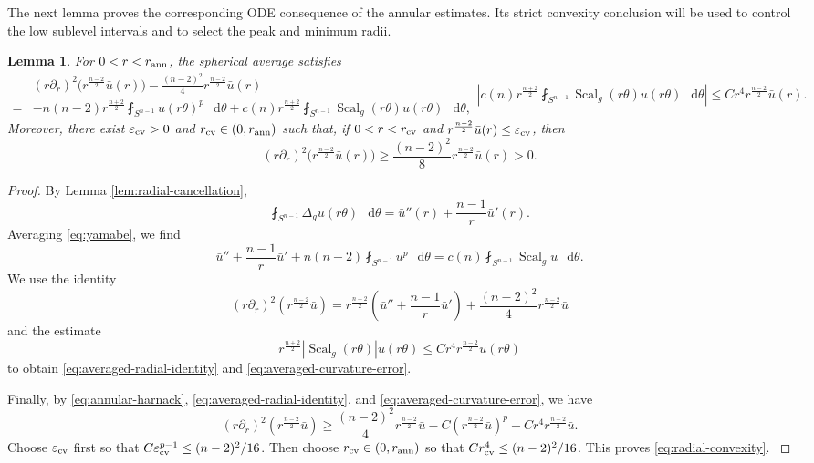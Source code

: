\documentclass[11pt]{article}
\numberwithin{equation}{section}
\newtheorem{lemma}[theorem]{Lemma}
\theoremstyle{remark}
\newcommand{\Sph}{S}
\newcommand{\pa}{\partial}
\newcommand{\eps}{\varepsilon}
\newcommand{\dd}{\mathop{}\!\mathrm{d}}
\begin{document}
{The next lemma proves the corresponding ODE consequence of
the annular estimates.  Its strict convexity conclusion will be used to
control the low sublevel intervals and to select the peak and minimum radii.}

\begin{lemma}\label{lem:radial-average-convexity}
For \(0<r<r_{\rm ann}\), the spherical average satisfies
\begin{subequations}
\begin{equation}\label{eq:averaged-radial-identity}
\begin{aligned}
 &(r\pa_r)^2\bigl(r^{\frac{n-2}{2}}\bar u(r)\bigr)
 -\frac{(n-2)^2}{4}r^{\frac{n-2}{2}}\bar u(r)\\
{}={}&-n(n-2)r^{\frac{n+2}{2}}
 \fint_{\Sph^{n-1}}u(r\theta)^p\,\dd\theta
 +c(n)r^{\frac{n+2}{2}}
 \fint_{\Sph^{n-1}}\operatorname{Scal}_g(r\theta)u(r\theta)\,\dd\theta,
\end{aligned}
\end{equation}
\begin{equation}\label{eq:averaged-curvature-error}
 \left|
 c(n)r^{\frac{n+2}{2}}
 \fint_{\Sph^{n-1}}\operatorname{Scal}_g(r\theta)u(r\theta)\,\dd\theta
 \right|
 \le Cr^4r^{\frac{n-2}{2}}\bar u(r).
\end{equation}
\end{subequations}
Moreover, there exist \(\eps_{\rm cv}>0\) and
\(r_{\rm cv}\in(0,r_{\rm ann})\) such that, if \(0<r<r_{\rm cv}\) and
\(r^{\frac{n-2}{2}}\bar u(r)\le\eps_{\rm cv}\), then
\begin{equation}\label{eq:radial-convexity}
 (r\pa_r)^2\bigl(r^{\frac{n-2}{2}}\bar u(r)\bigr)
 \ge\frac{(n-2)^2}{8}r^{\frac{n-2}{2}}\bar u(r)>0.
\end{equation}
\end{lemma}

\begin{proof}
By Lemma  \ref{lem:radial-cancellation},
\[
 \fint_{\Sph^{n-1}}\Delta_gu(r\theta)\,\dd\theta
 =
 \bar u''(r)+\frac{n-1}{r}\bar u'(r).
\]
{Averaging \eqref{eq:yamabe}, we find}
\[
 \bar u''+\frac{n-1}{r}\bar u'
 +n(n-2)\fint_{\Sph^{n-1}}u^p\,\dd\theta
 =
 c(n)\fint_{\Sph^{n-1}}\operatorname{Scal}_gu\,\dd\theta.
\]
{We use the identity}
\[
 (r\pa_r)^2(r^{\frac{n-2}{2}}\bar u)
 =
 r^{\frac{n+2}{2}}\left(\bar u''+\frac{n-1}{r}\bar u'\right)
 +\frac{(n-2)^2}{4}r^{\frac{n-2}{2}}\bar u
\]
and the estimate
\[
 r^{\frac{n+2}{2}}|\operatorname{Scal}_g(r\theta)|u(r\theta)
 \le Cr^4r^{\frac{n-2}{2}}u(r\theta)
\]
{to obtain \eqref{eq:averaged-radial-identity} and
\eqref{eq:averaged-curvature-error}.}

{
Finally, by \eqref{eq:annular-harnack},
\eqref{eq:averaged-radial-identity}, and
\eqref{eq:averaged-curvature-error}, we have
\[
 (r\pa_r)^2(r^{\frac{n-2}{2}}\bar u)
 \ge
 \frac{(n-2)^2}{4}r^{\frac{n-2}{2}}\bar u
 -C(r^{\frac{n-2}{2}}\bar u)^p
 -Cr^4r^{\frac{n-2}{2}}\bar u.
\]
Choose \(\eps_{\rm cv}\) first so that
\(C\eps_{\rm cv}^{p-1}\le(n-2)^2/16\). Then choose
\(r_{\rm cv}\in(0,r_{\rm ann})\) so that
\(Cr_{\rm cv}^4\le(n-2)^2/16\). This proves
\eqref{eq:radial-convexity}.
}
\end{proof}
\end{document}
